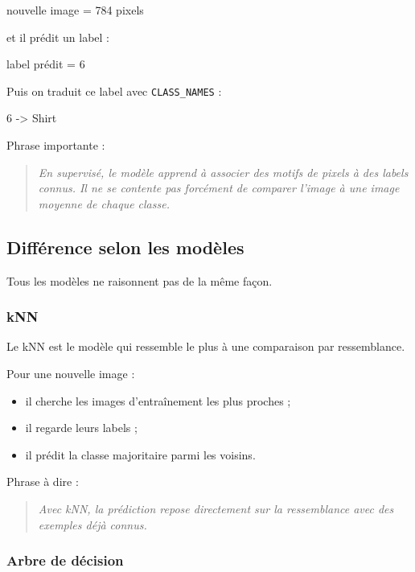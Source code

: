 \documentclass[11pt,a4paper]{article}
\begin{document}
\begin{codeblock}
nouvelle image = 784 pixels
\end{codeblock}

et il prédit un label :

\begin{codeblock}
label prédit = 6
\end{codeblock}

Puis on traduit ce label avec \texttt{CLASS\_NAMES} :

\begin{codeblock}
6 -> Shirt
\end{codeblock}

Phrase importante :

\begin{quote}
\itshape En supervisé, le modèle apprend à associer des motifs de pixels à des labels connus. Il ne se contente pas forcément de comparer l'image à une image moyenne de chaque classe.
\end{quote}

\subsection{Différence selon les modèles}

Tous les modèles ne raisonnent pas de la même façon.

\subsubsection{kNN}

Le kNN est le modèle qui ressemble le plus à une comparaison par ressemblance.

Pour une nouvelle image :

\begin{itemize}
\item il cherche les images d'entraînement les plus proches ;
\item il regarde leurs labels ;
\item il prédit la classe majoritaire parmi les voisins.
\end{itemize}

Phrase à dire :

\begin{quote}
\itshape Avec kNN, la prédiction repose directement sur la ressemblance avec des exemples déjà connus.
\end{quote}

\subsubsection{Arbre de décision}
\end{document}
